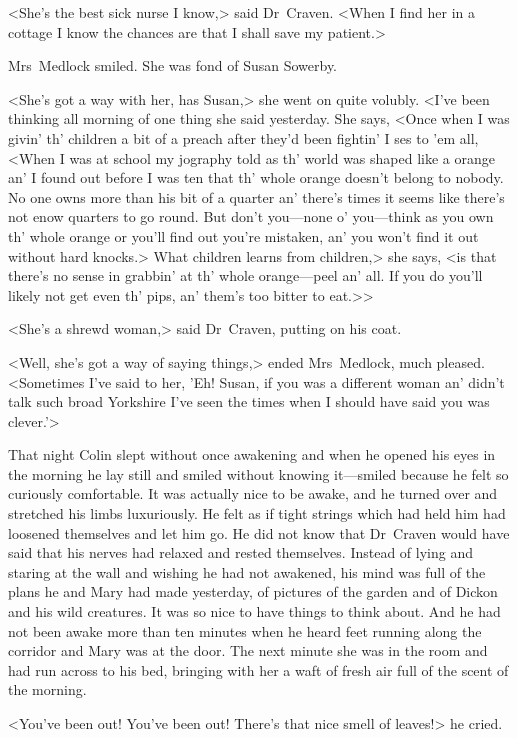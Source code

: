 <She's the best sick nurse I know,> said Dr~Craven. <When I find her in a cottage I know the chances are that I shall save my patient.>

Mrs~Medlock smiled. She was fond of Susan Sowerby.

<She's got a way with her, has Susan,> she went on quite volubly. <I've been thinking all morning of one thing she said yesterday. She says, <Once when I was givin' th' children a bit of a preach after they'd been fightin' I ses to 'em all, <When I was at school my jography told as th' world was shaped like a orange an' I found out before I was ten that th' whole orange doesn't belong to nobody. No one owns more than his bit of a quarter an' there's times it seems like there's not enow quarters to go round. But don't you—none o' you—think as you own th' whole orange or you'll find out you're mistaken, an' you won't find it out without hard knocks.> What children learns from children,> she says, <is that there's no sense in grabbin' at th' whole orange—peel an' all. If you do you'll likely not get even th' pips, an' them's too bitter to eat.>>

<She's a shrewd woman,> said Dr~Craven, putting on his coat.

<Well, she's got a way of saying things,> ended Mrs~Medlock, much pleased. <Sometimes I've said to her, 'Eh! Susan, if you was a different woman an' didn't talk such broad Yorkshire I've seen the times when I should have said you was clever.'>

That night Colin slept without once awakening and when he opened his eyes in the morning he lay still and smiled without knowing it—smiled because he felt so curiously comfortable. It was actually nice to be awake, and he turned over and stretched his limbs luxuriously. He felt as if tight strings which had held him had loosened themselves and let him go. He did not know that Dr~Craven would have said that his nerves had relaxed and rested themselves. Instead of lying and staring at the wall and wishing he had not awakened, his mind was full of the plans he and Mary had made yesterday, of pictures of the garden and of Dickon and his wild creatures. It was so nice to have things to think about. And he had not been awake more than ten minutes when he heard feet running along the corridor and Mary was at the door. The next minute she was in the room and had run across to his bed, bringing with her a waft of fresh air full of the scent of the morning.

<You've been out! You've been out! There's that nice smell of leaves!> he cried.

